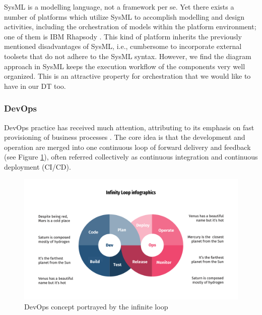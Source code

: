 SysML is a modelling language, not a framework per se. Yet there exists a number of platforms which utilize SysML to accomplish modelling and design activities, including the orchestration of models within the platform environment; one of them is IBM Rhapsody \cite{IBMSYSML}. This kind of platform inherits the previously mentioned disadvantages of SysML, i.e., cumbersome to incorporate external toolsets that do not adhere to the SysML syntax. However, we find the diagram approach in SysML keeps the execution workflow of the components very well organized. This is an attractive property for orchestration that we would like to have in our DT too.

\subsubsection{DevOps}
DevOps practice has received much attention, attributing to its emphasis on fast provisioning of business processes \cite{Ebert2016}. The core idea is that the development and operation are merged into one continuous loop of forward delivery and feedback (see Figure \ref{fig:devops}), often referred collectively as continuous integration and continuous deployment (CI/CD).

\begin{figure}[hbt!]
  \centering
  \includegraphics[scale=0.4]{figures/devops.pdf}
  \caption{DevOps concept portrayed by the infinite loop}
  \label{fig:devops}
\end{figure}


